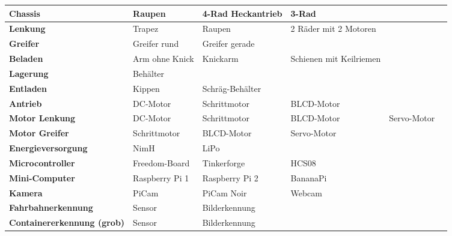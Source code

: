 \documentclass[a4paper, 10pt, fleqn]{article}
\begin{document}


\begin{table}[h]
\begin{tabular}{|m{}|M{0.15\textwidth}|M{0.15\textwidth}|M{0.15\textwidth}|M{0.15\textwidth}M{0.001\textwidth}|}
\hline

\textbf{Chassis} & Raupen & 4-Rad Heckantrieb & 3-Rad && \\[5ex]\hline 

\textbf{Lenkung} & Trapez & Raupen & 2 Räder mit 2 Motoren &&\\[5ex]\hline

\textbf{Greifer} & Greifer rund & Greifer gerade &&&\\[5ex]\hline

\textbf{Beladen} & Arm ohne Knick & Knickarm & Schienen mit Keilriemen&&\\[5ex]\hline

\textbf{Lagerung} & Behälter &&&&\\[5ex]\hline

\textbf{Entladen} & Kippen & Schräg-Behälter &&&\\[5ex]\hline

\textbf{Antrieb} & DC-Motor & Schrittmotor & BLCD-Motor &&\\[5ex]\hline

\textbf{Motor Lenkung} & DC-Motor & Schrittmotor & BLCD-Motor & Servo-Motor&\\[5ex]\hline

\textbf{Motor Greifer} & Schrittmotor & BLCD-Motor & Servo-Motor&&\\[5ex]\hline

\textbf{Energieversorgung} & NimH & LiPo&&&\\[5ex]\hline

\textbf{Microcontroller} & Freedom-Board & Tinkerforge & HCS08&&\\[5ex]\hline

\textbf{Mini-Computer} & Raspberry Pi 1 & Raspberry Pi 2 & BananaPi&&\\[5ex]\hline

\textbf{Kamera} & PiCam & PiCam Noir & Webcam & &\\[5ex]\hline

\textbf{Fahrbahnerkennung} & Sensor & Bilderkennung &&&\\[5ex]\hline

\textbf{Containererkennung (grob)} & Sensor & Bilderkennung&&& \\[5ex]\hline


\end{tabular}
\end{table}
\end{document}
